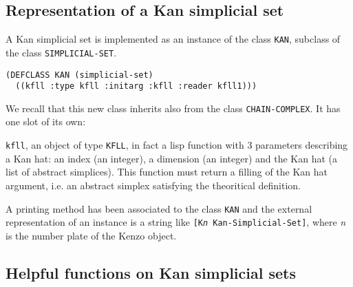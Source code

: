 \subsection {Representation of a Kan simplicial set}

A Kan simplicial set is implemented as an instance of the class {\tt KAN}, 
subclass of the class {\tt SIMPLICIAL-SET}.
{\footnotesize\begin{verbatim}
(DEFCLASS KAN (simplicial-set)
  ((kfll :type kfll :initarg :kfll :reader kfll1)))
\end{verbatim}}
We recall that this new class inherits also from the class {\tt CHAIN-COMPLEX}. It has one
slot of its own:
\begin{description}
\item {{\tt kfll}}, an object of type {\tt KFLL}, in fact a lisp function with $3$ parameters describing
a Kan hat:
an index (an integer), a dimension (an integer) and the Kan hat (a list of abstract simplices). This function
must return a filling of the Kan hat argument, i.e. an abstract simplex satisfying the theoritical
definition.
\end{description}
A printing method has been associated to the class {\tt KAN} and the external re\-pre\-sen\-ta\-ti\-on
of  an instance is a string like {\tt [K{\em n} Kan-Simplicial-Set]}, where {\em n} is the number plate of
the Kenzo object.

\subsection {Helpful functions on Kan simplicial sets}

